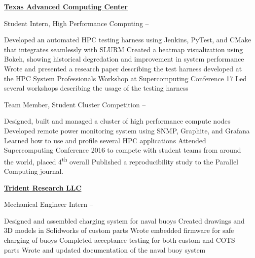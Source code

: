 \documentclass[letterpaper,MMMyyyy,nonstopmode]{simpleresumecv}
\begin{document}
\begin{Body}
\BigGap

\Entry
\href{http://tacc.utexas.edu}
{\textbf{Texas Advanced Computing Center}}

\Gap
\BulletItem
Student Intern, High Performance Computing
\hfill
{} --
\begin{Detail}
\SubBulletItem
Developed an automated HPC testing harness using Jenkins, PyTest, and CMake \newline
that integrates seamlessly with SLURM
\SubBulletItem
Created a heatmap visualization using Bokeh, showing historical degredation and \newline 
improvement in system performance
\SubBulletItem
Wrote and presented a research paper describing the test harness developed 
\newline at the HPC System Professionals Workshop at Supercomputing Conference 17
\SubBulletItem
Led several workshops describing the usage of the testing harness
\end{Detail}

\Gap
\BulletItem
Team Member, Student Cluster Competition
\hfill
{} --
\begin{Detail}
\SubBulletItem
Designed, built and managed a cluster of high performance compute nodes
\SubBulletItem
Developed remote power monitoring system using SNMP, Graphite, and Grafana
\SubBulletItem
Learned how to use and profile several HPC applications%
\SubBulletItem
Attended Supercomputing Conference 2016 to compete with student teams from around \newline 
the world, placed 4\textsuperscript{th} overall
\SubBulletItem
Published a reproducibility study to the Parallel Computing journal.
\end{Detail}

\BigGap

\Entry
\href{http://tridentresearch.com/}
{\textbf{Trident Research LLC}}

\Gap
\BulletItem
Mechanical Engineer Intern
\hfill
{} --
\begin{Detail}
\SubBulletItem
Designed and assembled charging system for naval buoys
\SubBulletItem
Created drawings and 3D models in Solidworks of custom parts
\SubBulletItem
Wrote embedded firmware for safe charging of buoys
\SubBulletItem
Completed acceptance testing for both custom and COTS parts
\SubBulletItem
Wrote and updated documentation of the naval buoy system
\end{Detail}


\end{Body}
\end{document}

